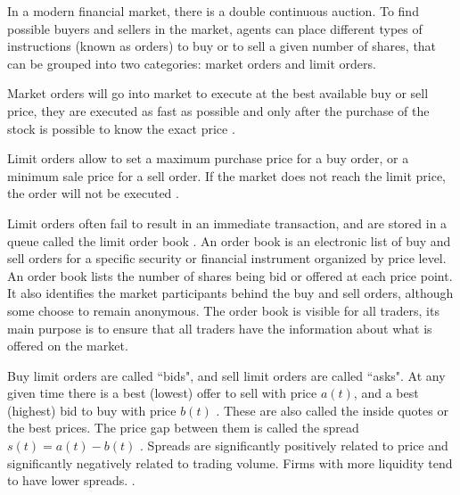 
In a modern financial market, there is a double continuous auction. To find
possible buyers and sellers in the market, agents can place different types of
instructions (known as orders) to buy or to sell a given number of shares, that
can be grouped into two categories: market orders and limit orders.

Market orders will go into market to execute at the best available buy or sell
price, they are executed as fast as possible and only after the purchase of the
stock is possible to know the exact price \cite{large_prices_changes,predictive_pow,stat_theory}.

Limit orders allow to set a maximum purchase price for a buy order, or a
minimum sale price for a sell order. If the market does not reach the limit
price, the order will not be executed \cite{large_prices_changes,predictive_pow,stat_theory}.

Limit orders often fail to result in an immediate transaction, and are stored
in a queue called the limit order book \cite{prop_order_book,stat_prop,predictive_pow}. An order book is an electronic list of
buy and sell orders for a specific security or financial instrument organized
by price level. An order book lists the number of shares being bid or offered
at each price point. It also identifies the market participants behind the buy
and sell orders, although some choose to remain anonymous. The order book is
visible for all traders, its main purpose is to ensure that all traders have
the information about what is offered on the market.

Buy limit orders are called ``bids", and sell limit orders are called ``asks".
At any given time there is a best (lowest) offer to sell with price
$a\left(t\right)$, and a best (highest) bid to buy with price
$b\left(t\right)$ \cite{subtle_nature,account_spread,limit_ord_spread,prop_order_book,stat_theory}. These
are also called the inside quotes or the best prices. The price gap between
them is called the spread $s\left(t\right) = a\left(t\right)-b\left(t\right)$
\cite{subtle_nature,Bouchaud_2004,large_prices_changes,account_spread,market_digest,stat_theory}.
Spreads are significantly positively related to price and significantly
negatively related to trading volume. Firms with more liquidity tend to have
lower spreads.
\cite{account_spread,effects_spread,components_spread,components_spread_tokyo}.